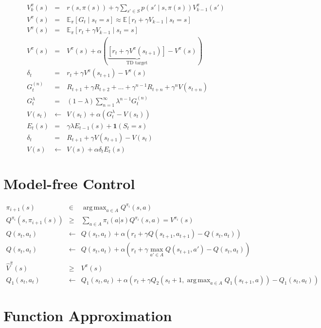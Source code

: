 \documentclass[]{article}
\DeclareMathOperator*{\argmax}{arg\,max}
\begin{document}
\begin{eqnarray}
     V^\pi_k (s) &=& r(s, \pi(s)) + \gamma \sum_{s' \in S} p(s' \mid s, \pi(s)) V^\pi_{k-1} (s') \\
     V^\pi (s) &=& \mathbb{E}_\pi [G_t \mid s_t = s] \approx \mathbb{E} [r_t + \gamma V_{k-1} \mid s_t = s]\\
     V^\pi (s) &=& \mathbb{E}_\pi [r_t + \gamma V_{k-1} \mid s_t = s]\\
     V^\pi(s) &=& V^\pi(s) + \alpha (\underbrace{[r_t + \gamma V^\pi (s_{t+1})]}_{\text{TD target}} - V^\pi(s))\\
     \delta_t &=& r_t + \gamma V^\pi(s_{t+1}) - V^\pi (s)\\
     G_t^{(n)} &=&  R_{t+1} + \gamma R_{t+2} + \ldots + \gamma^{n-1} R_{t+n} + \gamma^n V(s_{t+n})\\
     G_t^\lambda &=& (1-\lambda) \sum_{n=1}^{\infty} \lambda^{n-1} G_t^{(n)}\\
     V(s_t) &\gets& V(s_t) + \alpha \left(G_t^\lambda - V(s_t)\right)\\
     E_t(s) &=& \gamma \lambda E_{t-1}(s) + \mathbf{1}(S_t=s)\\
     \delta_t &=& R_{t+1} + \gamma V(s_{t+1}) - V(s_t)\\
	V(s) &\gets& V(s) + \alpha \delta_t E_t(s)
\end{eqnarray}


\section{Model-free Control}
\begin{eqnarray}
      \pi_{i+1}(s) &\in& \argmax_{a \in A} Q^{\pi_i}(s,a)\\
      Q^{\pi_i}(s,\pi_{i+1}(s)) &\geq& \sum_{a \in A} \pi_i(a|s) Q^{\pi_i}(s,a)= V^{\pi_i}(s)\nonumber\\
      Q(s_t,a_t) &\gets& Q(s_t, a_t) + \alpha (r_t + \gamma Q(s_{t+1}, a_{t+1}) - Q(s_t, a_t))\\
      Q(s_t,a_t) &\gets& Q(s_t, a_t) + \alpha (r_t + \gamma \max_{a' \in A} Q(s_{t+1}, a') - Q(s_t, a_t))\\
      \hat{V}^{\hat{\pi}}(s) &\geq& V^\pi(s)\\
      Q_1(s_t,a_t) &\gets& Q_1(s_t,a_t) + \alpha (r_t + \gamma Q_2(s_t+1, \argmax_{a \in A}Q_1(s_{t+1},a)) - Q_1(s_t,a_t))
\end{eqnarray}

\section{Function Approximation}
\end{document}
